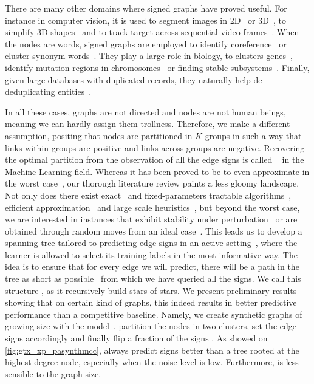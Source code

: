 There are many other domains where signed graphs have proved useful. For instance in computer
vision, it is used to segment images in 2D~\autocites{Kim2011}{Bagon2011}{CellSeg14} or
3D~\autocites{VolumeSegmentation12}{Beier2015}, to simplify 3D shapes~\autocite{Shape3D17} and to
track target across sequential video frames~\autocite{multiTracking15}. When the nodes are words,
signed graphs are employed to identify coreference~\autocites{graphicalCoreference04}{Elsner2009} or
cluster synonym words~\autocite{SignedWordRatings}. They play a large role in biology, to clusters
genes~\autocite{Ben-Dor99}, identify mutation regions in chromosomes~\autocite{Das2015} or finding
stable subsystems~\autocite{monotoneBiology07}. Finally, given large databases with duplicated
records, they naturally help de-deduplicating
entities~\autocites{Crosslingual07}{DeDup09}{LargeScaleDeDup09}{WeightedER14}.

In all these cases, graphs are not directed and nodes are not human beings, meaning we can hardly
assign them trollness.  Therefore, we make a different assumption, positing that nodes are
partitioned in $K$ groups in such a way that links within groups are positive and links across
groups are negative. Recovering the optimal partition from the observation of all the edge signs is
called \pcc{}~\autocite{Bansal2002} in the Machine Learning field. Whereas it has been proved to be
\NPc{} to even approximate in the worst case~\autocites{Charikar2003}{Demaine2006}, our thorough
literature review paints a less gloomy landscape. Not only does there exist
exact~\autocite{Berg2015} and fixed-parameters tractable algorithms~\autocites{GoldenCE12}{Fomin2014},
efficient approximation~\autocites{CCPivotConf05}{ChawlaArxiv14} and large scale
heuristics~\autocites{Levorato2015}{Facchetti2011isingmodel}{Kappes2016}, but beyond the worst case,
we are interested in instances that exhibit stability under
perturbation~\autocites{clusteringFeasibility15}{StableCC09}{StableLP09} or are obtained through
random moves from an ideal case~\autocites{plantedAilon09}{Makarychev2014}. This leads us to develop
a spanning tree tailored to predicting edge signs in an active setting~\autocite{Cesa-Bianchi2012b},
where the learner is allowed to select its training labels in the most informative way. The idea is
to ensure that for every edge we will predict, there will be a path in the tree as short as
possible~\autocites{LowerBound95}{Abraham2012} from which we have queried all the signs. We call
this structure \gtx{}, as it recursively build stars of stars. 
\iffalse
We present preliminary results showing that on certain
kind of graphs, this indeed results in better predictive performance than a competitive baseline.
Namely, we create synthetic graphs of growing size with the \lpa{} model~\autocite{Barabasi1999},
partition the nodes in two clusters, set the edge signs accordingly and finally flip a fraction of
the signs \uar{}. As showed on \autoref{fig:gtx_xp_pasynthmcc}, \gtx{} always predict signs better than a
\bfs{} tree rooted at the highest degree node, especially when the noise level is low. Furthermore,
\gtx{} is less sensible to the graph size.

